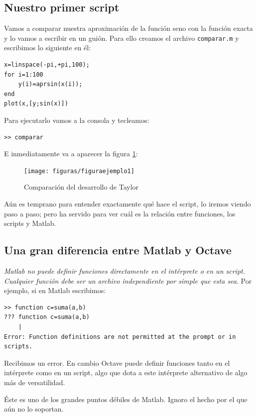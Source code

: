 \subsection{Nuestro primer script}

Vamos a comparar nuestra aproximación de la función seno con la
función exacta y lo vamos a escribir en un guión. Para ello creamos el
archivo \texttt{comparar.m} y escribimos lo siguiente en él:

\begin{verbatim}
x=linspace(-pi,+pi,100);
for i=1:100
    y(i)=aprsin(x(i));
end
plot(x,[y;sin(x)])
\end{verbatim}
Para ejecutarlo vamos a la consola y tecleamos:

\begin{verbatim}
>> comparar
\end{verbatim}
E inmediatamente va a aparecer la figura \ref{cap:figura-ejemplo1}:


\begin{figure}[h]
  \centering{}\texttt{[image: figuras/figuraejemplo1]}


  \caption{\label{cap:figura-ejemplo1}Comparación del desarrollo de
    Taylor}
\end{figure}


Aún es temprano para entender exactamente qué hace el script, lo
iremos viendo paso a paso; pero ha servido para ver cuál es la
relación entre funciones, los scripts y Matlab.


\subsection{Una gran diferencia entre Matlab y Octave}

\emph{Matlab no puede definir funciones directamente en el intérprete
o en un script.  Cualquier función debe ser un archivo independiente
por simple que esta sea}. Por ejemplo, si en Matlab escribimos:

\begin{verbatim}
>> function c=suma(a,b)
??? function c=suma(a,b)
    |
Error: Function definitions are not permitted at the prompt or in scripts.
\end{verbatim}
Recibimos un error.  En cambio Octave puede definir funciones tanto
en el intérprete como en un script, algo que dota a este intérprete
alternativo de algo más de versatilidad.

Éste es uno de los grandes puntos débiles de Matlab. Ignoro
el hecho por el que aún no lo soportan.

